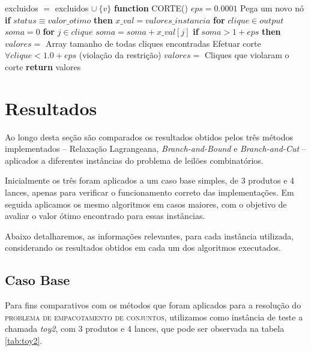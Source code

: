 \documentclass{article}
\newenvironment{algoritmo}[1][]
  {\begin{algorithm}[#1]
     \selectlanguage{brazil}%
     \floatname{algorithm}{Algoritmo}%
  }
  {\end{algorithm}}
\begin{document}
\begin{algoritmo}[H]
\begin{algorithmic}[1]
            \State \indent \indent excluidos $=$ excluidos $\cup ~ \{v\}$
            \Statex
            \State \textbf{function}\textsc{ CORTE}()
            \State \indent $eps = 0.0001$
            \State \indent Pega um novo nó
            \State \indent \textbf{if}{ $status \equiv valor\_otimo$  }\textbf{then}
            \State \indent $x\_val = valores\_instancia$ 
            \State \indent \textbf{for}{ $clique \in output$}
            \State \indent \indent $soma = 0$
            \State \indent \indent \textbf{for}{ $j \in clique$}
            \State \indent \indent \indent $soma = soma + x\_val[j]$
            \State \indent \indent \textbf{if}{ $soma > 1 + eps $ }\textbf{then}
            \State \indent \indent {}
            \State \indent \indent \indent $valores = $ Array tamanho de todas cliques encontradas
            \State \indent \indent \indent Efetuar corte $\forall clique < 1.0+eps$ (violação da restrição)
            \State \indent \indent \indent $valores = $ Cliques que violaram o corte
            \State \indent \textbf{ return }{valores}
            
            \State 
        \end{algorithmic}
    \end{algoritmo}
	
	\section{Resultados}\label{sec:res}

	Ao longo desta seção são comparados os resultados obtidos pelos três métodos implementados -- Relaxação Lagrangeana, \emph{Branch-and-Bound} e \emph{Branch-and-Cut} -- aplicados a diferentes instâncias do problema de leilões combinatórios.
	
	Inicialmente os três foram aplicados a um caso base simples, de 3 produtos e 4 lances, apenas para verificar o funcionamento correto das implementações. Em seguida aplicamos os mesmo algoritmos em casos maiores, com o objetivo de avaliar o valor ótimo encontrado para essas instâncias. 
	
	Abaixo detalharemos, as informações relevantes, para cada instância utilizada, considerando os resultados obtidos em cada um dos algoritmos executados.
	
		\subsection{Caso Base} \label{sec:caso}
	    Para fins comparativos com os métodos que foram aplicados para a resolução do \textsc{problema de empacotamento de conjuntos}, utilizamos como instância de teste a chamada \textit{toy2}, com 3 produtos e 4 lances, que pode ser observada na tabela \ref{tab:toy2}.
	    
\end{document}
